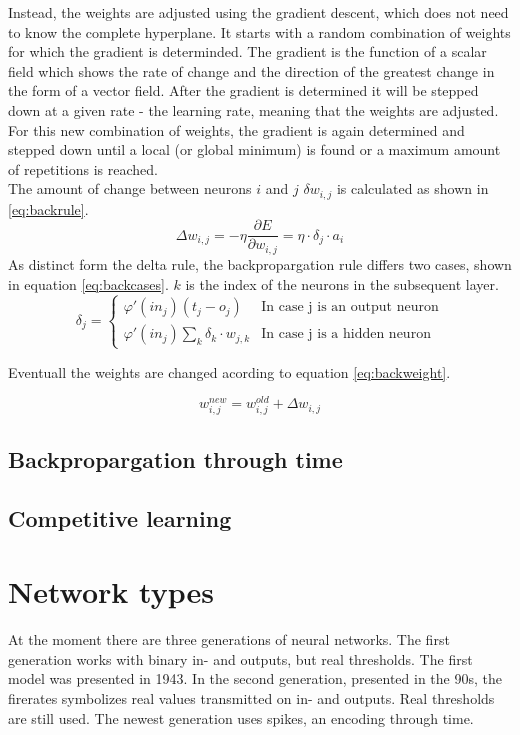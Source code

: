 \documentclass[10pt,a4paper,DIV=11]{scrreprt}
\begin{document}
Instead, the weights are adjusted using the gradient descent, which does not need to know the complete hyperplane. It starts with a random combination of weights for which the gradient is determinded. The gradient is the function of a scalar field which shows the rate of change and the direction of the greatest change in the form of a vector field. After the gradient is determined it will be stepped down at a given rate - the learning rate, meaning that the weights are adjusted. For this new combination of weights, the gradient is again determined and stepped down until a local (or global minimum) is found or a maximum amount of repetitions is reached.\\

The amount of change between neurons $i$ and $j$ $\delta w_{i,j}$ is calculated as shown in \eqref{eq:backrule}.
\begin{equation}
\Delta w_{i,j} = -\eta \frac{\partial E}{\partial w_{i,j}} = \eta \cdot \delta_j \cdot a_i
\label{eq:backrule}
\end{equation}
As distinct form the delta rule, the backpropargation rule differs two cases, shown in equation \eqref{eq:backcases}. $k$ is the index of the neurons in the subsequent layer.
\begin{equation}
   \delta_j =
   \begin{cases}
     \varphi'(in_j)(t_j-o_j) & \text{In case j is an output neuron} \\
     \varphi'(in_j)\sum_{k} \delta_k \cdot w_{j,k} & \text{In case j is a hidden neuron}
   \end{cases}
\label{eq:backcases}
\end{equation}

Eventuall the weights are changed acording to equation \eqref{eq:backweight}.

\begin{equation}
   w_{i,j}^{new} = w_{i,j}^{old} + \Delta w_{i,j}
\label{eq:backweight}
\end{equation}

\subsection{Backpropargation through time}
\subsection{Competitive learning}
\section{Network types}
At the moment there are three generations of neural networks. 
The first generation works with binary in- and outputs, but real thresholds. The first model was presented in 1943.
In the second generation, presented in the 90s, the firerates symbolizes real values transmitted on in- and outputs. Real thresholds are still used.
The newest generation uses spikes, an encoding through time.
\end{document}
